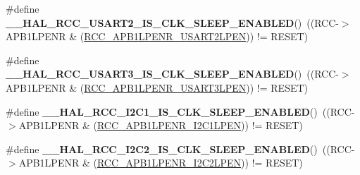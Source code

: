 \begin{DoxyCompactItemize}
\item 
\hypertarget{group___r_c_c___a_p_b1___clock___sleep___enable___disable___status_ga91dc6d0fdf5c1c70158336df3bf5e097}{\#define {\bfseries \-\_\-\-\_\-\-H\-A\-L\-\_\-\-R\-C\-C\-\_\-\-U\-S\-A\-R\-T2\-\_\-\-I\-S\-\_\-\-C\-L\-K\-\_\-\-S\-L\-E\-E\-P\-\_\-\-E\-N\-A\-B\-L\-E\-D}()~((R\-C\-C-\/$>$A\-P\-B1\-L\-P\-E\-N\-R \& (\hyperlink{group___peripheral___registers___bits___definition_ga6055c39af369463e14d6ff2017043671}{R\-C\-C\-\_\-\-A\-P\-B1\-L\-P\-E\-N\-R\-\_\-\-U\-S\-A\-R\-T2\-L\-P\-E\-N})) != R\-E\-S\-E\-T)}\label{group___r_c_c___a_p_b1___clock___sleep___enable___disable___status_ga91dc6d0fdf5c1c70158336df3bf5e097}

\item 
\hypertarget{group___r_c_c___a_p_b1___clock___sleep___enable___disable___status_ga998cffc84c7d5866a7e4cfae1f764327}{\#define {\bfseries \-\_\-\-\_\-\-H\-A\-L\-\_\-\-R\-C\-C\-\_\-\-U\-S\-A\-R\-T3\-\_\-\-I\-S\-\_\-\-C\-L\-K\-\_\-\-S\-L\-E\-E\-P\-\_\-\-E\-N\-A\-B\-L\-E\-D}()~((R\-C\-C-\/$>$A\-P\-B1\-L\-P\-E\-N\-R \& (\hyperlink{group___peripheral___registers___bits___definition_gae11baa29f4e6d122dabdd54c6b4be052}{R\-C\-C\-\_\-\-A\-P\-B1\-L\-P\-E\-N\-R\-\_\-\-U\-S\-A\-R\-T3\-L\-P\-E\-N})) != R\-E\-S\-E\-T)}\label{group___r_c_c___a_p_b1___clock___sleep___enable___disable___status_ga998cffc84c7d5866a7e4cfae1f764327}

\item 
\hypertarget{group___r_c_c___a_p_b1___clock___sleep___enable___disable___status_ga39a3efabea0fb3cffae7be7726dd668e}{\#define {\bfseries \-\_\-\-\_\-\-H\-A\-L\-\_\-\-R\-C\-C\-\_\-\-I2\-C1\-\_\-\-I\-S\-\_\-\-C\-L\-K\-\_\-\-S\-L\-E\-E\-P\-\_\-\-E\-N\-A\-B\-L\-E\-D}()~((R\-C\-C-\/$>$A\-P\-B1\-L\-P\-E\-N\-R \& (\hyperlink{group___peripheral___registers___bits___definition_ga33286469d0a9b9fedbc2b60aa6cd7da7}{R\-C\-C\-\_\-\-A\-P\-B1\-L\-P\-E\-N\-R\-\_\-\-I2\-C1\-L\-P\-E\-N})) != R\-E\-S\-E\-T)}\label{group___r_c_c___a_p_b1___clock___sleep___enable___disable___status_ga39a3efabea0fb3cffae7be7726dd668e}

\item 
\hypertarget{group___r_c_c___a_p_b1___clock___sleep___enable___disable___status_gaffe9902aa539eca59920b6b165bd1c71}{\#define {\bfseries \-\_\-\-\_\-\-H\-A\-L\-\_\-\-R\-C\-C\-\_\-\-I2\-C2\-\_\-\-I\-S\-\_\-\-C\-L\-K\-\_\-\-S\-L\-E\-E\-P\-\_\-\-E\-N\-A\-B\-L\-E\-D}()~((R\-C\-C-\/$>$A\-P\-B1\-L\-P\-E\-N\-R \& (\hyperlink{group___peripheral___registers___bits___definition_gaf6a53d37df11a56412ae06f73626f637}{R\-C\-C\-\_\-\-A\-P\-B1\-L\-P\-E\-N\-R\-\_\-\-I2\-C2\-L\-P\-E\-N})) != R\-E\-S\-E\-T)}\label{group___r_c_c___a_p_b1___clock___sleep___enable___disable___status_gaffe9902aa539eca59920b6b165bd1c71}


\end{DoxyCompactItemize}
